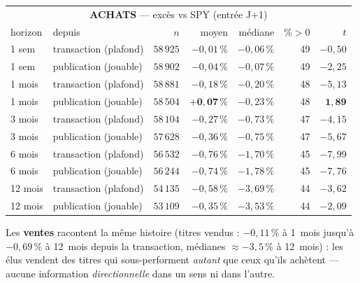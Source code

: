 \documentclass[11pt,a4paper]{article}
\begin{document}
\begin{center}\small
\begin{tabular}{llrrrrr}
\toprule
\multicolumn{7}{c}{\textbf{ACHATS} --- excès vs SPY (entrée J+1)}\\
horizon & depuis & $n$ & moyen & médiane & \%$>0$ & $t$ \\
\midrule
1 sem & transaction (plafond) & $58\,925$ & $-0{,}01\,\%$ & $-0{,}06\,\%$ & 49 & $-0{,}50$ \\
1 sem & publication (jouable) & $58\,902$ & $-0{,}04\,\%$ & $-0{,}07\,\%$ & 49 & $-2{,}25$ \\
1 mois & transaction (plafond) & $58\,881$ & $-0{,}18\,\%$ & $-0{,}20\,\%$ & 48 & $-5{,}13$ \\
1 mois & publication (jouable) & $58\,504$ & $\mathbf{+0{,}07\,\%}$ & $-0{,}23\,\%$ & 48 & $\mathbf{1{,}89}$ \\
3 mois & transaction (plafond) & $58\,104$ & $-0{,}27\,\%$ & $-0{,}73\,\%$ & 47 & $-4{,}15$ \\
3 mois & publication (jouable) & $57\,628$ & $-0{,}36\,\%$ & $-0{,}75\,\%$ & 47 & $-5{,}67$ \\
6 mois & transaction (plafond) & $56\,532$ & $-0{,}76\,\%$ & $-1{,}70\,\%$ & 45 & $-7{,}99$ \\
6 mois & publication (jouable) & $56\,244$ & $-0{,}74\,\%$ & $-1{,}78\,\%$ & 45 & $-7{,}76$ \\
12 mois & transaction (plafond) & $54\,135$ & $-0{,}58\,\%$ & $-3{,}69\,\%$ & 44 & $-3{,}62$ \\
12 mois & publication (jouable) & $53\,109$ & $-0{,}35\,\%$ & $-3{,}53\,\%$ & 44 & $-2{,}09$ \\
\bottomrule
\end{tabular}
\end{center}

Les \textbf{ventes} racontent la même histoire (titres vendus : $-0{,}11\,\%$ à 1~mois jusqu'à
$-0{,}69\,\%$ à 12~mois depuis la transaction, médianes $\approx-3{,}5\,\%$ à 12~mois) : les élus vendent
des titres qui sous-performent \emph{autant} que ceux qu'ils achètent --- aucune information
\emph{directionnelle} dans un sens ni dans l'autre.
\end{document}
